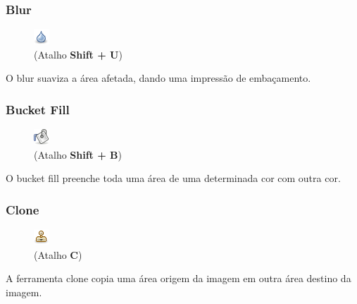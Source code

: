 \documentclass[12pt,onecolumn]{article}
\begin{document}
    \subsubsection{Blur}
      \begin{figure}
        \vspace{-40pt}
        \begin{center}
          \includegraphics{gimp-icons/stock-tool-blur-22.png} \\
          (Atalho {\bf Shift + U})
        \end{center}
        \label{fig:blur}
        \vspace{-20pt}
      \end{figure}
      O blur suaviza a área afetada, dando uma impressão de embaçamento.

    \subsubsection{Bucket Fill}
      \begin{figure}
        \vspace{-40pt}
        \begin{center}
          \includegraphics{gimp-icons/stock-tool-bucket-fill-22.png} \\
          (Atalho {\bf Shift + B})
        \end{center}
        \label{fig:bucket}
        \vspace{-20pt}
      \end{figure}
      O bucket fill preenche toda uma área de uma determinada cor com outra cor.
    
    \subsubsection{Clone}
      \begin{figure}
        \vspace{-40pt}
        \begin{center}
          \includegraphics{gimp-icons/stock-tool-clone-22.png} \\
          (Atalho {\bf C})
        \end{center}
        \label{fig:clone}
        \vspace{-20pt}
      \end{figure}
      A ferramenta clone copia uma área origem da imagem em outra área destino da imagem.
      
\end{document}

